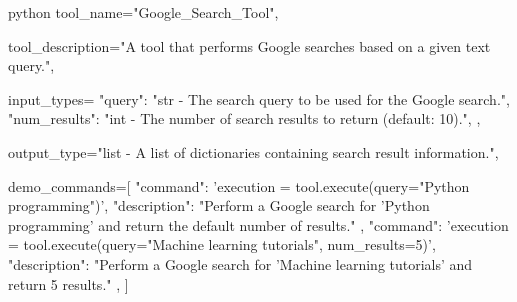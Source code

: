 \begin{codecolorbox}{python}
tool_name="Google_Search_Tool",

tool_description="A tool that performs Google searches based on a given text query.",

input_types={
    "query": "str - The search query to be used for the Google search.",
    "num_results": "int - The number of search results to return (default: 10).",
},

output_type="list - A list of dictionaries containing search result information.",

demo_commands=[
    {
        "command": 'execution = tool.execute(query="Python programming")',
        "description": "Perform a Google search for 'Python programming' and return the default number of results."
    },
    {
        "command": 'execution = tool.execute(query="Machine learning tutorials", num_results=5)',
        "description": "Perform a Google search for 'Machine learning tutorials' and return 5 results."
    },
]
\end{codecolorbox}


